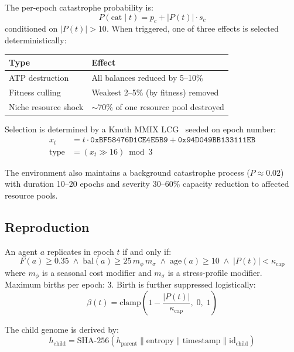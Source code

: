 \documentclass[11pt,a4paper]{article}
\begin{document}
The per-epoch catastrophe probability is:
\begin{equation}
  P(\text{cat} \mid t) = p_c + |P(t)| \cdot s_c
\end{equation}
conditioned on $|P(t)| > 10$. When triggered, one of three effects is selected deterministically:

\begin{table}[H]
\centering
\small
\begin{tabular}{@{}ll@{}}
\toprule
Type & Effect \\
\midrule
ATP destruction & All balances reduced by 5--10\% \\
Fitness culling & Weakest 2--5\% (by fitness) removed \\
Niche resource shock & $\sim$70\% of one resource pool destroyed \\
\bottomrule
\end{tabular}
\end{table}

Selection is determined by a Knuth MMIX LCG~\citep{knuth1997art} seeded on epoch number:
\begin{align}
  x_{t} &= t \cdot \texttt{0xBF58476D1CE4E5B9} + \texttt{0x94D049BB133111EB} \\
  \text{type} &= (x_t \gg 16) \bmod 3
\end{align}

The environment also maintains a background catastrophe process ($P \approx 0.02$) with duration 10--20 epochs and severity 30--60\% capacity reduction to affected resource pools.

\subsection{Reproduction}

An agent $a$ replicates in epoch $t$ if and only if:
\begin{equation}
  F(a) \geq 0.35 \;\wedge\; \text{bal}(a) \geq 25\, m_\phi\, m_\sigma \;\wedge\; \text{age}(a) \geq 10 \;\wedge\; |P(t)| < \kappa_{\text{cap}}
\end{equation}
where $m_\phi$ is a seasonal cost modifier and $m_\sigma$ is a stress-profile modifier. Maximum births per epoch: 3. Birth is further suppressed logistically:
\begin{equation}
  \beta(t) = \text{clamp}\!\left(1 - \frac{|P(t)|}{\kappa_{\text{cap}}},\; 0,\; 1\right)
\end{equation}

The child genome is derived by:
\begin{equation}
  h_{\text{child}} = \text{SHA-256}(h_{\text{parent}} \| \text{entropy} \| \text{timestamp} \| \text{id}_{\text{child}})
\end{equation}
\end{document}
